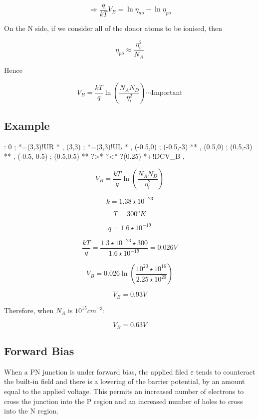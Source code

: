 \documentclass[a4paper,12pt]{article}
\begin{document}
\[ \Rightarrow \frac{q}{kT} V_{B} = \ln{\eta_{n o}} - \ln{\eta_{p o}} \]

On the N side, if we consider all of the donor atoms to be
ionised, then

\[ \eta_{p o} \approx \frac{\eta_{i}^{2}}{N_{A}} \]

Hence

\[ V_{B} = \frac{kT}{q} \ln{\left(\frac{N_{A}
N_{D}}{\eta_{i}^{2}}\right)} \cdots \mbox{Important} \]

\subsection{Example}

\begin{table}[hbtp]

\xy <1cm,0cm>:
0 ; *=(3,3)!UR *\frm{-} ,
(3,3) ; *=(3,3)!UL *\frm{-} ,
(-0.5,0) ; (-0.5,-3) **\dir{--} ,
(0.5,0) ; (0.5,-3) **\dir{--} ,
(-0.5, 0.5) ; (0.5,0.5) **\dir{-} ?>*\dir{>} ?<*\dir{<} ?(0.25)
*+!DC{V_{B}} ,
\endxy

\end{table}

\[ V_{B} = \frac{kT}{q} \ln{\left(\frac{N_{A}
N_{D}}{\eta_{i}^{2}}\right)} \]

\[ k = 1.38 \star 10^{-23} \]

\[ T = 300^{o}K \]

\[ q = 1.6 \star 10^{-19} \]

\[ \frac{kT}{q} = \frac{1.3 \star 10^{-23} \star 300}{1.6 \star
10^{-19}} = 0.026V \]

\[ V_{B} = 0.026 \ln{\left( \frac{10^{20} \star 10^{16}}{2.25 \star
10^{20} } \right)} \]

\[ V_{B} = 0.93V \]

Therefore, when $N_{A}$ is $10^{15} cm^{-3}$:

\[ V_{B} = 0.63 V \]

\subsection{Forward Bias}

When a PN junction is under forward bias, the applied filed
$\varepsilon$ tends to counteract the built-in field and there is a
lowering of the barrier potential, by an amount equal to the applied
voltage. This permits an increased number of electrons to cross the
junction into the P region and an increased number of holes to cross
into the N region.
\end{document}
